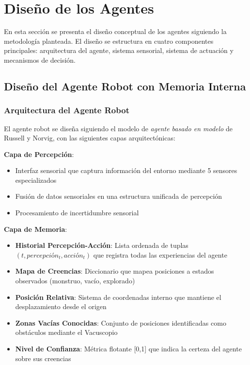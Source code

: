 \documentclass[10pt,twocolumn]{article}
\begin{document}
\section{Diseño de los Agentes}

En esta sección se presenta el diseño conceptual de los agentes siguiendo la metodología planteada. El diseño se estructura en cuatro componentes principales: arquitectura del agente, sistema sensorial, sistema de actuación y mecanismos de decisión.

\subsection{Diseño del Agente Robot con Memoria Interna}

\subsubsection{Arquitectura del Agente Robot}

El agente robot se diseña siguiendo el modelo de \textit{agente basado en modelo} de Russell y Norvig, con las siguientes capas arquitectónicas:

\textbf{Capa de Percepción}:
\begin{itemize}
\item Interfaz sensorial que captura información del entorno mediante 5 sensores especializados
\item Fusión de datos sensoriales en una estructura unificada de percepción
\item Procesamiento de incertidumbre sensorial
\end{itemize}

\textbf{Capa de Memoria}:
\begin{itemize}
\item \textbf{Historial Percepción-Acción}: Lista ordenada de tuplas $(t, percepción_t, acción_t)$ que registra todas las experiencias del agente
\item \textbf{Mapa de Creencias}: Diccionario que mapea posiciones a estados observados (monstruo, vacío, explorado)
\item \textbf{Posición Relativa}: Sistema de coordenadas interno que mantiene el desplazamiento desde el origen
\item \textbf{Zonas Vacías Conocidas}: Conjunto de posiciones identificadas como obstáculos mediante el Vacuscopio
\item \textbf{Nivel de Confianza}: Métrica flotante [0,1] que indica la certeza del agente sobre sus creencias
\end{itemize}
\end{document}

